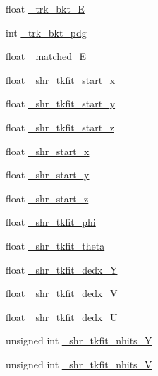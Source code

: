 \begin{DoxyCompactItemize}
\item 
float \hyperlink{classselection_1_1CC0piNpSelection_aa7a6076f1169185e0b2b02fbb03aba22}{\-\_\-trk\-\_\-bkt\-\_\-\-E}
\item 
int \hyperlink{classselection_1_1CC0piNpSelection_a7044de37ee4f3615ffe4bb15e9f00f8e}{\-\_\-trk\-\_\-bkt\-\_\-pdg}
\item 
float \hyperlink{classselection_1_1CC0piNpSelection_ac75aa3ac33061bbdd378594ee7e6e2e5}{\-\_\-matched\-\_\-\-E}
\item 
float \hyperlink{classselection_1_1CC0piNpSelection_a44002e3cc4d16dce6e6f61ee3a2bae6a}{\-\_\-shr\-\_\-tkfit\-\_\-start\-\_\-x}
\item 
float \hyperlink{classselection_1_1CC0piNpSelection_acd1826c44855b71bce92253f7ac1a758}{\-\_\-shr\-\_\-tkfit\-\_\-start\-\_\-y}
\item 
float \hyperlink{classselection_1_1CC0piNpSelection_a4d3591a8bb7abd9e320f35ca3bf311c2}{\-\_\-shr\-\_\-tkfit\-\_\-start\-\_\-z}
\item 
float \hyperlink{classselection_1_1CC0piNpSelection_ac0fb4dbd656f2f3fb2c12ffc02a0df7c}{\-\_\-shr\-\_\-start\-\_\-x}
\item 
float \hyperlink{classselection_1_1CC0piNpSelection_ade6717f479b053a2c2c9082e597d599f}{\-\_\-shr\-\_\-start\-\_\-y}
\item 
float \hyperlink{classselection_1_1CC0piNpSelection_a6e8b4637c8de2991e4d48291d3e90ddf}{\-\_\-shr\-\_\-start\-\_\-z}
\item 
float \hyperlink{classselection_1_1CC0piNpSelection_aefb0bc61c417330a448ababb5363ad8f}{\-\_\-shr\-\_\-tkfit\-\_\-phi}
\item 
float \hyperlink{classselection_1_1CC0piNpSelection_a11df391e482434665c389423bbb9ec5d}{\-\_\-shr\-\_\-tkfit\-\_\-theta}
\item 
float \hyperlink{classselection_1_1CC0piNpSelection_ababbbc32babdef645c2edc613713ceb7}{\-\_\-shr\-\_\-tkfit\-\_\-dedx\-\_\-\-Y}
\item 
float \hyperlink{classselection_1_1CC0piNpSelection_a428fc549513bea0e1ca92cf90c1148cd}{\-\_\-shr\-\_\-tkfit\-\_\-dedx\-\_\-\-V}
\item 
float \hyperlink{classselection_1_1CC0piNpSelection_aaaef69409457695e2300bf847a13804c}{\-\_\-shr\-\_\-tkfit\-\_\-dedx\-\_\-\-U}
\item 
unsigned int \hyperlink{classselection_1_1CC0piNpSelection_ae3a53326b19594013c9df08b66ccaa73}{\-\_\-shr\-\_\-tkfit\-\_\-nhits\-\_\-\-Y}
\item 
unsigned int \hyperlink{classselection_1_1CC0piNpSelection_adab23c54dd799cdf83c31a10e4ae9061}{\-\_\-shr\-\_\-tkfit\-\_\-nhits\-\_\-\-V}

\end{DoxyCompactItemize}

